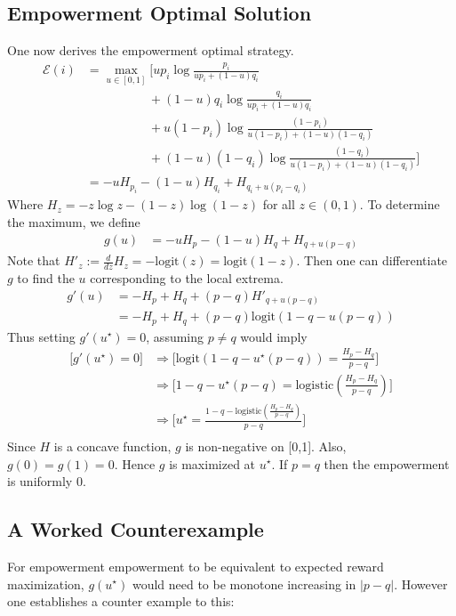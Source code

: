 \documentclass{article}
\newcommand{\Ee}{\mathcal{E}}
\begin{document}
\subsection{Empowerment Optimal Solution}
One now derives the empowerment optimal strategy. 
\begin{align*}
\Ee(i) 
	&= \max_{u\in [0,1]}\bigg[up_i \log \frac{p_i}{up_i+(1-u)q_i}\\
	&\hspace{5em} + (1-u)q_i \log \frac{q_i}{up_i+(1-u)q_i}\\
	&\hspace{5em} + u(1-p_i) \log \frac{(1-p_i)}{u(1-p_i)+(1-u)(1-q_i)}\\
	&\hspace{5em} + (1-u)(1-q_i) \log \frac{(1-q_i)}{u(1-p_i)+(1-u)(1-q_i)}\bigg]\\
	&=-uH_{p_i}-(1-u)H_{q_i}+H_{q_i+u(p_i-q_i)}
\end{align*}
Where $H_z=-z\log z - (1-z)\log(1-z)$ for all $z\in (0,1)$. To determine the maximum, we define 
\begin{align*}
g(u)&= -uH_{p}-(1-u)H_{q}+H_{q+u(p-q)} 
\end{align*}
Note that $H'_z:=\frac{d}{dz} H_z= -\text{logit}(z)=\text{logit}(1-z)$.
Then one can differentiate $g$ to find the $u$ corresponding to the local extrema.
\begin{align*}
g'(u) 
	&= -H_p + H_q + (p-q)H'_{q+u(p-q)}\\
	&= -H_p + H_q +(p-q)\text{logit}(1-q-u(p-q))
\end{align*}
Thus setting $g'(u^\star)=0$, assuming $p\neq q$ would imply
\begin{align*}
\bigg[g'(u^\star)=0\bigg]
	&\Rightarrow\bigg[\text{logit}(1-q-u^\star(p-q)) = \frac{H_{p}-H_{q}}{p-q}\bigg]\\
	&\Rightarrow\bigg[1-q-u^\star(p-q) = \text{logistic}\left(\frac{H_{p}-H_{q}}{p-q}\right)\bigg]\\
	&\Rightarrow\bigg[u^\star=\frac{1-q-\text{logistic}\left(\frac{H_{p}-H_{q}}{p-q}\right)}{p-q} \bigg]\\
\end{align*}
Since $H$ is a concave function, $g$ is non-negative on [0,1]. Also, $g(0)=g(1)=0$. Hence $g$ is maximized at $u^\star$. If $p=q$ then the empowerment is uniformly $0$.

\subsection{A Worked Counterexample}
For empowerment empowerment to be equivalent to expected reward maximization, $g(u^\star)$ would need to be monotone increasing in $|p-q|$. However one establishes a counter example to this: 
\end{document}
